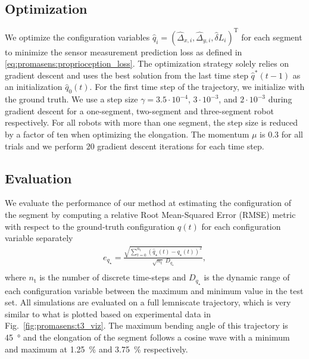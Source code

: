 \subsection{Optimization}
We optimize the configuration variables $\hat{q}_i = (\hat{\Delta}_{x,i}, \hat{\Delta}_{y,i}, \hat{\delta} L_{i})^\mathrm{T}$ for each segment to minimize the sensor measurement prediction loss as defined in \eqref{eq:promasens:proprioception_loss}.
The optimization strategy solely relies on gradient descent and uses the best solution from the last time step $\hat{q}^*(t-1)$ as an initialization $\hat{q}_0(t)$. For the first time step of the trajectory, we initialize with the ground truth.
We use a step size $\gamma = 3.5 \cdot 10^{-4}$, $3 \cdot 10^{-3}$, and $2 \cdot 10^{-3}$ during gradient descent for a one-segment, two-segment and three-segment robot respectively. For all robots with more than one segment, the step size is reduced by a factor of ten when optimizing the elongation. The momentum $\mu$ is $0.3$ for all trials and we perform $20$ gradient descent iterations for each time step.

\subsection{Evaluation}\label{sub:promasens:pcc_simulations:evaluation}
We evaluate the performance of our method at estimating the configuration of the segment by computing a relative Root Mean-Squared Error (RMSE) metric with respect to the ground-truth configuration $q(t)$ for each configuration variable separately
\begin{equation}\label{eq:promasens:relative_RMSE}
\begin{split}
    e_{q_\star} = \frac{\sqrt{\sum_{t=0}^{n_\mathrm{t}} \left ( \hat{q}_\star(t) - q_\star(t) \right )^2}}{\sqrt{n_\mathrm{t}} \; D_{q_\star}},\\
\end{split}
\end{equation}
where $n_\mathrm{t}$ is the number of discrete time-steps and $D_{q_\star}$ is the dynamic range of each configuration variable between the maximum and minimum value in the test set.
All simulations are evaluated on a full lemniscate trajectory, which is very similar to what is plotted based on experimental data in Fig.~\ref{fig:promasens:t3_viz}. The maximum bending angle of this trajectory is \SI{45}{\degree} and the elongation of the segment follows a cosine wave with a minimum and maximum at \SI{1.25}{\percent} and \SI{3.75}{\percent} respectively.

